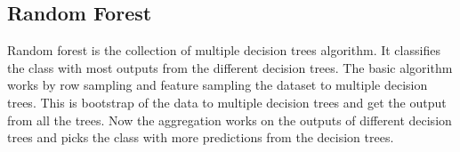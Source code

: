 \subsection{Random Forest}
Random forest is the collection of multiple decision trees algorithm. It classifies the class with most outputs from the different decision trees. The basic algorithm works by row sampling and feature sampling the dataset to multiple decision trees. This is bootstrap of the data to multiple decision trees and get the output from all the trees. Now the aggregation works on the outputs of different decision trees and picks the class with more predictions from the decision trees.

 
 


  

